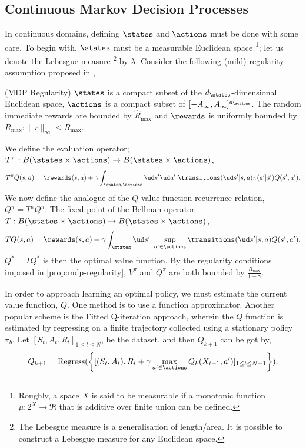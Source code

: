 \subsection{Continuous Markov Decision Processes} 

In continuous domains, defining $\states$ and $\actions$ must be done
with some care. To begin with, $\states$ must be a measurable
Euclidean space \footnote{Roughly, a space $X$ is said to be
measurable if a monotonic function $\mu: 2^X \to \Re$ that is additive
over finite union can be defined.}; let us denote the Lebesgue measure
\footnote{The Lebesgue measure is a generalisation of length/area. It
is possible to construct a Lebesgue measure for any Euclidean space.}
by $\lambda$.  Consider the following (mild) regularity assumption
proposed in \citet{Andra2008}, 
\begin{property}(MDP Regularity)
  \label{prop:mdp-regularity}
  $\states$ is a compact subset of the $d_{\states}$-dimensional
  Euclidean space, $\actions$ is a compact subset of $[-A_{\infty},
  A_{\infty}]^{d_{\actions}}$. The random immediate rewards are bounded
  by $\hat{R}_{\max}$ and $\rewards$ is uniformly bounded by $R_{\max}:
  \|r\|_{\infty} \le R_{\max}$.
\end{property}

We define the evaluation operator; $T^{\pi}:B(\states \times \actions)
\to B(\states \times \actions)$, $$ T^{\pi}Q(s,a) = \rewards(s,a)
+ \gamma \int_{\states,\actions} \ud s' \ud a'~ \transitions(\ud
s'|s,a) \pi(a'|s') Q(s',a').  $$ We now define the analogue of the
$Q$-value function recurrence relation, $Q^{\pi} = T^{\pi}Q^{\pi}$.
The fixed point of the Bellman operator $T :B(\states \times \actions)
\to B(\states \times \actions)$, $$ TQ(s,a) = \rewards(s,a) + \gamma
\int_{\states} \ud s'~ \sup_{a' \in \actions} \transitions(\ud s'|s,a)
Q(s',a'),$$ $Q^* = TQ^*$ is then the optimal value function. By the
regularity conditions imposed in \autoref{prop:mdp-regularity},
$V^{\pi}$ and $Q^{\pi}$ are both bounded by $\frac{R_{\max}}{1
- \gamma}$.

In order to approach learning an optimal policy, we must estimate the
current value function, $Q$. One method is to use a function
approximator. Another popular scheme is the Fitted Q-iteration
approach, wherein the $Q$ function is estimated by regressing on
a finite trajectory collected using a stationary policy $\pi_b$. Let
$[S_t, A_t, R_t]_{1 \le t \le N}$, be the dataset, and then $Q_{k+1}$
can be got by, $$Q_{k+1} = \textrm{Regress}( \left\{ [(S_t, A_t), R_t
+ \gamma \max_{a' \in \actions} Q_k(X_{t+1},a')]_{1 \le t \le N-1}
\right\} ).$$

